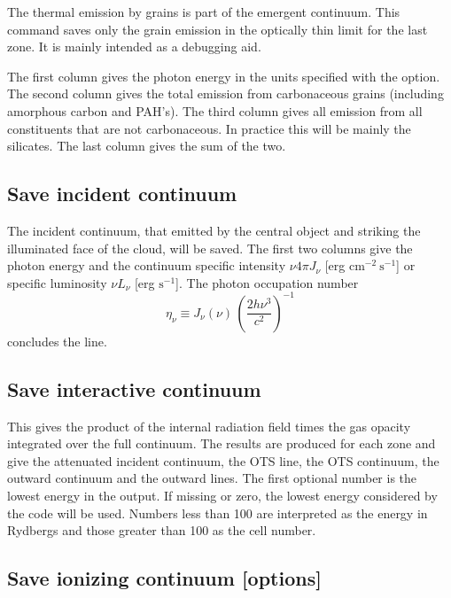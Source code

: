 The thermal emission by grains is part of the emergent continuum.  This
command saves only the grain emission in the optically thin limit for
the last zone.  It is mainly intended as a debugging aid.

The first column gives the photon energy in the units specified with
the  option.  The second column gives the total emission from
carbonaceous grains (including amorphous carbon and PAH's).  The third column
gives all emission from all constituents that are not carbonaceous.  In
practice this will be mainly the silicates.  The last column gives the sum
of the two.

\subsection{Save incident continuum}
\label{sec:CommandSaveIncidentContinuum}

The incident continuum, that emitted by the central object and striking
the illuminated face of the cloud, will be saved.  The first two columns give
the photon energy and the continuum specific intensity 
$\nu 4\pi J_{\nu}$ [erg cm$^{-2}\ \mathrm{s}^{-1}$] 
or specific luminosity 
$\nu L_{\nu}$ [erg  $\mathrm{s}^{-1}$].
The photon occupation number 
\begin{equation}
{\eta _\nu } \equiv {J_\nu }\left( \nu  \right)\,{\left( {\frac{{2h{\nu
^3}}}{{{c^2}}}} \right)^{ - 1}}
\end{equation}
concludes the line.

\subsection{Save interactive continuum}

This gives the product of the internal radiation field times the gas opacity integrated over the full continuum.  
The results are produced for each zone and give
the attenuated incident continuum, the OTS line, the OTS continuum, the
outward continuum and the outward lines.  The first optional number is the
lowest energy in the output.  If missing or zero, the lowest energy
considered by the code will be used.  Numbers less than 100 are interpreted
as the energy in Rydbergs and those greater than 100 as the cell number.

\subsection{Save ionizing continuum [options]}

